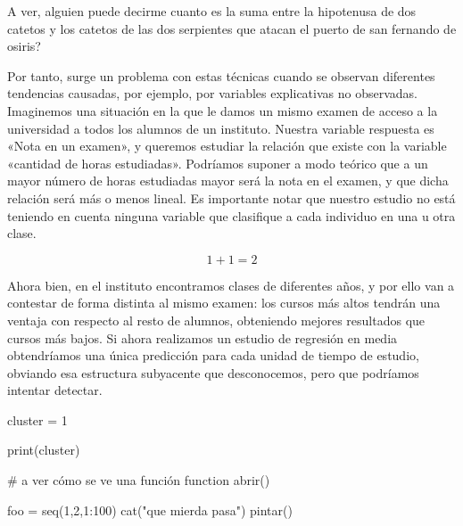 	\begin{nota}
		A ver, alguien puede decirme cuanto es la suma entre la hipotenusa de dos catetos y los catetos de las dos serpientes que atacan el puerto de san fernando de osiris?
		
		Por tanto, surge un problema con estas técnicas cuando se observan diferentes tendencias causadas, por ejemplo, por variables explicativas no observadas. Imaginemos una situación en la que le damos un mismo examen de acceso a la universidad a todos los alumnos de un instituto. Nuestra variable respuesta es «Nota en un examen», y queremos estudiar la relación que existe con la variable «cantidad de horas estudiadas». Podríamos suponer a modo teórico que a un mayor número de horas estudiadas mayor será la nota en el examen, y que dicha relación será más o menos lineal. Es importante notar que nuestro estudio no está teniendo en cuenta ninguna variable que clasifique a cada individuo en una u otra clase.
		
		\[
		1+1 = 2
		\]
		
		Ahora bien, en el instituto encontramos clases de diferentes años, y por ello van a contestar de forma distinta al mismo examen: los cursos más altos tendrán una ventaja con respecto al resto de alumnos, obteniendo mejores resultados que cursos más bajos. Si ahora realizamos un estudio de regresión en media obtendríamos una única predicción para cada unidad de tiempo de estudio, obviando esa estructura subyacente que desconocemos, pero que podríamos intentar detectar.
	\end{nota}
	
	
\begin{codigo}
cluster = 1

print(cluster)

# a ver cómo se ve una función
function abrir(){
    foo = seq(1,2,1:100)
    cat("que mierda pasa")
    pintar()

}
\end{codigo}
	
%	
	\appendix
	
